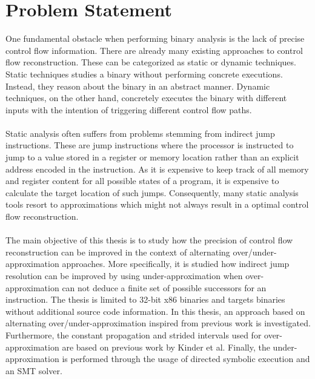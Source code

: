 \documentclass{kththesis}
\begin{document}
\section{Problem Statement}
One fundamental obstacle when performing binary analysis is the lack of precise control flow information. There are already many existing approaches to control flow reconstruction. These can be categorized as static or dynamic techniques. Static techniques studies a binary without performing concrete executions. Instead, they reason about the binary in an abstract manner. Dynamic techniques, on the other hand, concretely executes the binary with different inputs with the intention of triggering different control flow paths. 
\\ \\ 
Static analysis often suffers from problems stemming from indirect jump instructions. These are jump instructions where the processor is instructed to jump to a value stored in a register or memory location rather than an explicit address encoded in the instruction. As it is expensive to keep track of all memory and register content for all possible states of a program, it is expensive to calculate the target location of such jumps. Consequently, many static analysis tools resort to approximations which might not always result in a optimal control flow reconstruction.
\\ \\
The main objective of this thesis is to study how the precision of control flow reconstruction can be improved in the context of alternating over/under-approximation approaches. More specifically, it is studied how indirect jump resolution can be improved by using under-approximation when over-approximation can not deduce a finite set of possible successors for an instruction. The thesis is limited to 32-bit x86 binaries and targets binaries without additional source code information.
\clearpage
In this thesis, an approach based on alternating over/under-approximation inspired from previous work\cite{alternating} is investigated. Furthermore, the constant propagation and strided intervals used for over-approximation are based on previous work by Kinder et al\cite{Jakstab}. Finally, the under-approximation is performed through the usage of directed symbolic execution and an SMT solver. 
\end{document}
